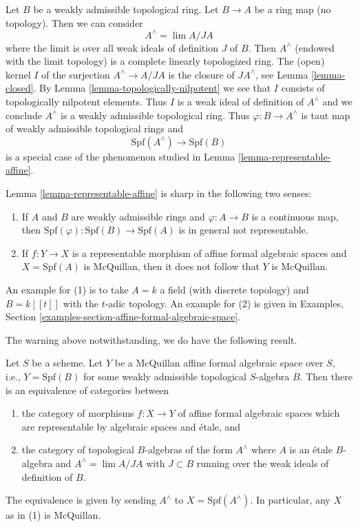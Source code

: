 \begin{example}
\label{example-representable-morphism-from-completion}
Let $B$ be a weakly admissible topological ring. Let $B \to A$ be
a ring map (no topology). Then we can consider
$$
A^\wedge = \lim A/JA
$$
where the limit is over all weak ideals of definition $J$ of $B$.
Then $A^\wedge$ (endowed with the limit topology) is a
complete linearly topologized ring. The (open) kernel $I$
of the surjection $A^\wedge \to A/JA$ is the closure of $JA^\wedge$, see
Lemma \ref{lemma-closed}. By
Lemma \ref{lemma-topologically-nilpotent}
we see that $I$ consists of topologically nilpotent elements.
Thus $I$ is a weak ideal of definition of $A^\wedge$ and we conclude
$A^\wedge$ is a weakly admissible topological ring. Thus
$\varphi : B \to A^\wedge$ is taut map of weakly admissible
topological rings and
$$
\text{Spf}(A^\wedge) \longrightarrow \text{Spf}(B)
$$
is a special case of the phenomenon studied in
Lemma \ref{lemma-representable-affine}.
\end{example}

\begin{remark}[Warning]
\label{remark-warning}
Lemma \ref{lemma-representable-affine} is sharp in the following
two senses:
\begin{enumerate}
\item If $A$ and $B$ are weakly admissible rings and $\varphi : A \to B$
is a continuous map, then
$\text{Spf}(\varphi) : \text{Spf}(B) \to \text{Spf}(A)$ is in general
not representable.
\item If $f : Y \to X$ is a representable morphism of affine
formal algebraic spaces and $X = \text{Spf}(A)$ is McQuillan,
then it does not follow that $Y$ is McQuillan.
\end{enumerate}
An example for (1) is to take $A = k$ a field (with discrete topology)
and $B = k[[t]]$ with the $t$-adic topology.
An example for (2) is given in
Examples, Section \ref{examples-section-affine-formal-algebraic-space}.
\end{remark}

\noindent
The warning above notwithstanding, we do have the following result.

\begin{lemma}
\label{lemma-etale}
Let $S$ be a scheme. Let $Y$ be a McQuillan affine formal algebraic space
over $S$, i.e., $Y = \text{Spf}(B)$ for some weakly admissible topological
$S$-algebra $B$. Then there is an equivalence of categories between
\begin{enumerate}
\item the category of morphisms $f : X \to Y$
of affine formal algebraic spaces which are representable
by algebraic spaces and \'etale, and
\item the category of topological $B$-algebras of the form
$A^\wedge$ where $A$ is an \'etale $B$-algebra and
$A^\wedge = \lim A/JA$ with $J \subset B$ running over the
weak ideals of definition of $B$.
\end{enumerate}
The equivalence is given by sending $A^\wedge$ to  $X = \text{Spf}(A^\wedge)$.
In particular, any $X$ as in (1) is McQuillan.
\end{lemma}

